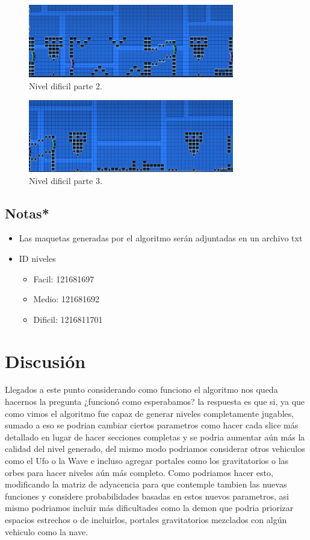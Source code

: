 \documentclass{article}
\begin{document}
\begin{figure}[H]
    \centering
    \includegraphics[width=0.8\textwidth]{Niveles/Dificil/d2.jpg}
    \caption{Nivel dificil parte 2.}
    \label{dificil_2}
\end{figure}
\begin{figure}[H]
    \centering
    \includegraphics[width=0.8\textwidth]{Niveles/Dificil/d3.jpg}
    \caption{Nivel dificil parte 3.}
    \label{dificil_3}
\end{figure}
\subsection{Notas*}
\begin{itemize}
    \item Las maquetas generadas por el algoritmo serán adjuntadas en un archivo txt
    \item ID niveles
    \begin{itemize}
        \item Facil: 121681697
        \item Medio: 121681692
        \item Dificil: 1216811701
    \end{itemize}
\end{itemize}


\section{Discusión}
Llegados a este punto considerando como funciono el algoritmo nos queda hacernos la pregunta ¿funcionó como esperabamos? la respuesta es que si, ya que como vimos el algoritmo fue capaz de generar niveles completamente jugables, sumado a eso se podrian cambiar ciertos parametros como hacer cada slice más detallado en lugar de hacer secciones completas y se podria aumentar aún más la calidad del nivel generado, del mismo modo podriamos considerar otros vehiculos como el Ufo o la Wave e incluso agregar portales como los gravitatorios o las orbes para hacer niveles aún más completo. Como podriamos hacer esto, modificando la matriz de adyacencia para que contemple tambien las nuevas funciones y considere probabilidades basadas en estos nuevos parametros, asi mismo podriamos incluir más dificultades como la demon que podria priorizar espacios estrechos o de incluirlos, portales gravitatorios mezclados con algún vehiculo como la nave.
\end{document}

